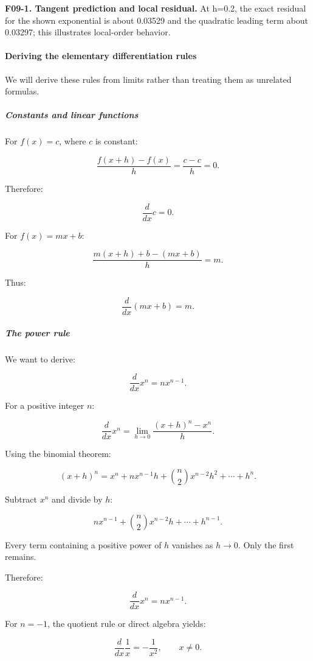 \textbf{F09-1. Tangent prediction and local residual.} At h=0.2, the exact residual for the shown exponential is about 0.03529 and the quadratic leading term about 0.03297; this illustrates local-order behavior.

\paragraph{Deriving the elementary differentiation rules}\label{01-foundations-i-ch020-deriving-the-elementary-differentiation-rules}

We will derive these rules from limits rather than treating them as unrelated formulas.

\subparagraph{Constants and linear functions}\label{01-foundations-i-ch020-constants-and-linear-functions}

For \(f(x)=c\), where \(c\) is constant:

\[
\frac{f(x+h)-f(x)}h=\frac{c-c}h=0.
\]

Therefore:

\[
\frac d{dx}c=0.
\]

For \(f(x)=mx+b\):

\[
\frac{m(x+h)+b-(mx+b)}h=m.
\]

Thus:

\[
\frac d{dx}(mx+b)=m.
\]

\subparagraph{The power rule}\label{01-foundations-i-ch020-the-power-rule}

We want to derive:

\[
\boxed{\frac d{dx}x^n=nx^{n-1}}.
\]

For a positive integer \(n\):

\[
\frac d{dx}x^n = \lim_{h\to0}\frac{(x+h)^n-x^n}{h}.
\]

Using the binomial theorem:

\[
(x+h)^n= x^n+nx^{n-1}h+ \binom n2x^{n-2}h^2+\cdots+h^n.
\]

Subtract \(x^n\) and divide by \(h\):

\[
nx^{n-1}+ \binom n2x^{n-2}h+\cdots+h^{n-1}.
\]

Every term containing a positive power of \(h\) vanishes as \(h\to0\). Only the first remains.

Therefore:

\[
\frac d{dx}x^n=nx^{n-1}.
\]

For \(n=-1\), the quotient rule or direct algebra yields:

\[
\frac d{dx}\frac1x=-\frac1{x^2},\qquad x\ne0.
\]

